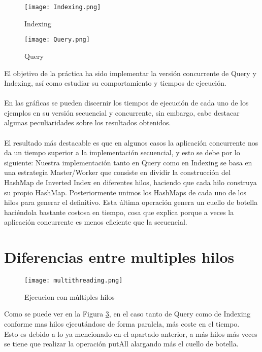\documentclass{article}
\begin{document}
\begin{figure}[hbt!]
  \texttt{[image: Indexing.png]}
  \caption{Indexing}
  \label{fig:indexing}
\end{figure}
\begin{figure}[hbt!]
  \texttt{[image: Query.png]}
  \caption{Query}
  \label{fig:query}
\end{figure}
\newpage
El objetivo de la práctica ha sido implementar la versión concurrente de 
Query y Indexing, así como estudiar su comportamiento y tiempos de ejecución.
\\\\ 
En las gráficas se pueden discernir los tiempos de ejecución
de cada uno de los ejemplos en su versión secuencial y concurrente, sin embargo, cabe destacar algunas peculiaridades sobre los resultados obtenidos.\\
\\
El resultado más destacable es que en algunos casos la aplicación concurrente nos da un tiempo superior a la implementación secuencial, y esto se debe por lo siguiente:
Nuestra implementación tanto en Query como en Indexing se basa en una estrategia Master/Worker que consiste en dividir la construcción del HashMap de Inverted Index en diferentes hilos, haciendo que cada hilo construya su propio HashMap. Posteriormente unimos los HashMaps de cada uno de los hilos para generar el definitivo. Esta última operación genera un cuello de botella haciéndola bastante costosa en tiempo, cosa que explica porque a veces la aplicación concurrente es menos eficiente que la secuencial.

\section{Diferencias entre multiples hilos}
\begin{figure}[hbt!]
  \texttt{[image: multithreading.png]}
  \caption{Ejecucion con múltiples hilos}
  \label{fig:multhilos}
\end{figure}

Como se puede ver en la Figura \ref{fig:multhilos}, en el caso tanto de Query como de Indexing conforme mas hilos ejecutándose de forma paralela, más coste en el tiempo.\\
Esto es debido a lo ya mencionado en el apartado anterior, a más hilos más veces se tiene que realizar la operación putAll alargando más el cuello de botella.\\
\end{document}
